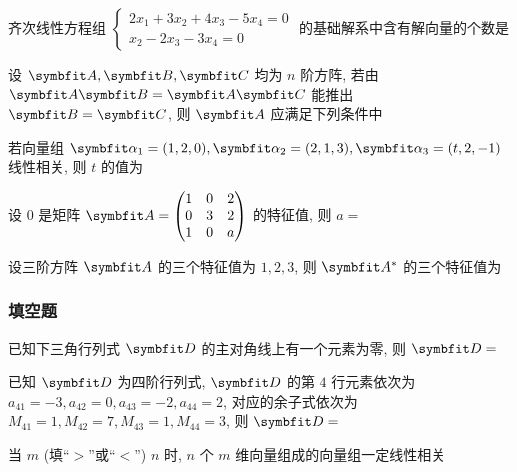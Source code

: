 \begin{ti}
	齐次线性方程组 $\begin{cases}
		2x_{1} + 3x_{2} + 4x_{3} - 5x_{4} = 0 \\
		x_{2} - 2x_{3} - 3x_{4} = 0
	\end{cases}$ 的基础解系中含有解向量的个数是 \kuo
\end{ti}

\begin{ti}
	设 $\bA,\bB,\bC$ 均为 $n$ 阶方阵, 若由 $\bA \bB = \bA \bC$ 能推出 $\bB = \bC$, 则 $\bA$ 应满足下列条件中 \kuo
\end{ti}

\begin{ti}
	若向量组 $\balpha_{1} = (1,2,0),\balpha_{2} = (2,1,3),\balpha_{3} = (t,2,-1)$ 线性相关, 则 $t$ 的值为 \kuo
\end{ti}

\begin{ti}
	设 $0$ 是矩阵 $\bA = \begin{pmatrix}
		1 & 0 & 2 \\
		0 & 3 & 2 \\
		1 & 0 & a
	\end{pmatrix}$ 的特征值, 则 $a = $ \kuo
\end{ti}

\begin{ti}
	设三阶方阵 $\bA$ 的三个特征值为 $1,2,3$, 则 $\bA^{\astt}$ 的三个特征值为 \kuo
\end{ti}

\subsubsection{填空题}
\begin{ti}
	已知下三角行列式 $\bD$ 的主对角线上有一个元素为零, 则 $\bD = $ \hua
\end{ti}

\begin{ti}
	已知 $\bD$ 为四阶行列式, $\bD$ 的第 $4$ 行元素依次为 $a_{41} = -3, a_{42} = 0, a_{43} = -2, a_{44} = 2$, 对应的余子式依次为 $M_{41} = 1, M_{42} = 7, M_{43} = 1, M_{44} = 3$, 则 $\bD = $ \hua
\end{ti}

\begin{ti}
	当 $m$ \hua{} (填“$>$”或“$<$”) $n$ 时, $n$ 个 $m$ 维向量组成的向量组一定线性相关
\end{ti}

